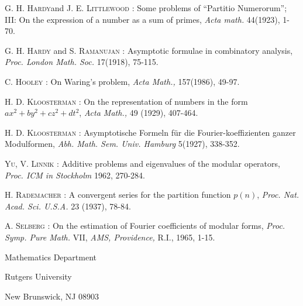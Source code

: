 \begin{thebibliography}{99}
 \textsc{G. H. Hardy}\pageoriginale and \textsc{J. E. Littlewood} : Some problems of ``Partitio Numerorum''; III: On the expression of a number as a sum of primes, \textit{Acta math.} 44(1923), 1-70.

 \textsc{G. H. Hardy} and \textsc{S. Ramanujan} : Asymptotic formulae in combinatory analysis, \textit{Proc. London Math. Soc.} 17(1918), 75-115.

 \textsc{C. Hooley} : On Waring's problem, \textit{Acta Math.,} 157(1986), 49-97.

 \textsc{H. D. Kloosterman} : On the representation of numbers in the form $ax^2 + by^2 + cz^2+ dt^2$, \textit{Acta Math.,} 49 (1929), 407-464.

 \textsc{H. D. Kloosterman} : Asymptotische Formeln f\"ur die Fourier-koeffizienten ganzer Modulformen, \textit{Abh. Math. Sem. Univ. Hamburg} 5(1927), 338-352.

 \textsc{Yu, V. Linnik} : Additive problems and eigenvalues of the modular operators, \textit{Proc. ICM in Stockholm} 1962, 270-284.
 
 \textsc{H. Rademacher} : A convergent series for the partition function $p(n)$, \textit{Proc. Nat. Acad. Sci. U.S.A.} 23 (1937), 78-84.

 \textsc{A. Selberg} : On the estimation of Fourier coefficients of modular forms, \textit{Proc. Symp. Pure Math.} VII, \textit{AMS, Providence,} R.I., 1965, 1-15.
\end{thebibliography}

\medskip
\noindent
{\small Mathematics Department}

\noindent
{\small Rutgers University}

\noindent
{\small New Brunswick, NJ 08903}

